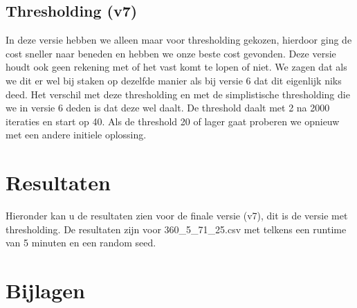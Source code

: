 \documentclass[a4paper, 11pt, one column]{article}
\begin{document}
\subsection{Thresholding (v7)}

In deze versie hebben we alleen maar voor thresholding gekozen, hierdoor ging de cost sneller naar beneden en hebben we onze beste cost gevonden.
Deze versie houdt ook geen rekening met of het vast komt te lopen of niet. We zagen dat als we dit er wel bij staken op dezelfde manier als bij versie 6 dat dit eigenlijk niks deed.
Het verschil met deze thresholding en met de simplistische thresholding die we in versie 6 deden is dat deze wel daalt. De threshold daalt met 2 na 2000 iteraties en start op 40.
Als de threshold 20 of lager gaat proberen we opnieuw met een andere initiele oplossing.

\section{Resultaten}
Hieronder kan u de resultaten zien voor de finale versie (v7), dit is de versie met thresholding. De resultaten zijn voor 360\_5\_71\_25.csv met telkens een runtime van 5 minuten en een random seed.

\begin{center}
\end{center}
\section{Bijlagen}

\end{document}
